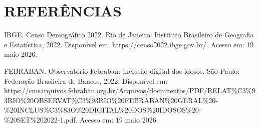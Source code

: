 \newpage
\section{REFERÊNCIAS}
IBGE. Censo Demográfico 2022. Rio de Janeiro: Instituto Brasileiro de Geografia e Estatística, 2022. Disponível em: https://censo2022.ibge.gov.br/. Acesso em: 19 maio 2026.

FEBRABAN. Observatório Febraban: inclusão digital dos idosos. São Paulo: Federação Brasileira de Bancos, 2022. Disponível em: https://cmsarquivos.febraban.org.br/Arquivos/documentos/PDF/RELAT\%C3\%93RIO\%20OBSERVAT\%C3\%93RIO\%20FEBRABAN\%20GERAL\%20-\%20INCLUS\%C3\%83O\%20DIGITAL\%20DOS\%20IDOSOS\%20-\%20SET\%202022-1.pdf. Acesso em: 19 maio 2026.